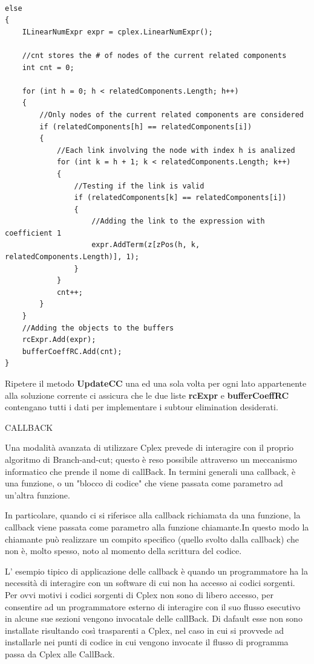 \documentclass[11pt]{article}
\begin{document}
\begin{lstlisting}

else
{
	ILinearNumExpr expr = cplex.LinearNumExpr();

	//cnt stores the # of nodes of the current related components
	int cnt = 0;

	for (int h = 0; h < relatedComponents.Length; h++)
	{
		//Only nodes of the current related components are considered
		if (relatedComponents[h] == relatedComponents[i])
		{
			//Each link involving the node with index h is analized
			for (int k = h + 1; k < relatedComponents.Length; k++)
			{
				//Testing if the link is valid
				if (relatedComponents[k] == relatedComponents[i])
				{
					//Adding the link to the expression with coefficient 1
					expr.AddTerm(z[zPos(h, k, relatedComponents.Length)], 1);
				}
			}
			cnt++;
		}
	}
	//Adding the objects to the buffers
	rcExpr.Add(expr);
	bufferCoeffRC.Add(cnt);
}

\end{lstlisting}

Ripetere il metodo \textbf{UpdateCC} una ed una sola volta per ogni lato appartenente alla soluzione corrente ci assicura che le due liste \textbf{rcExpr} e \textbf{bufferCoeffRC} contengano tutti i dati per implementare i subtour elimination desiderati.

\vspace{2\baselineskip}
CALLBACK 
\vspace{2\baselineskip}

Una modalità avanzata di utilizzare Cplex prevede di interagire con il proprio algoritmo di Branch-and-cut; questo è reso possibile attraverso un meccanismo informatico che prende il nome
di callBack. In termini generali una callback, è una funzione, o un "blocco di codice" che viene passata come parametro ad un'altra funzione. 

In particolare, quando ci si riferisce alla callback richiamata da una funzione, la callback viene passata come parametro alla funzione chiamante.In questo modo la chiamante può realizzare un compito specifico (quello svolto dalla callback) che non è, molto spesso, noto al momento della scrittura del codice. 

L’ esempio tipico di applicazione delle callback è quando un programmatore ha la necessità di interagire con un software di cui non ha accesso ai codici sorgenti. Per ovvi motivi i codici sorgenti di Cplex non sono di libero accesso, per consentire ad un programmatore esterno di interagire con il suo flusso esecutivo  in alcune sue sezioni vengono  invocatale delle callBack. Di dafault esse non sono installate risultando così trasparenti a Cplex, nel caso in cui si provvede ad installarle nei punti di codice in cui vengono invocate il flusso di programma passa da Cplex alle CallBack. 
\end{document}
